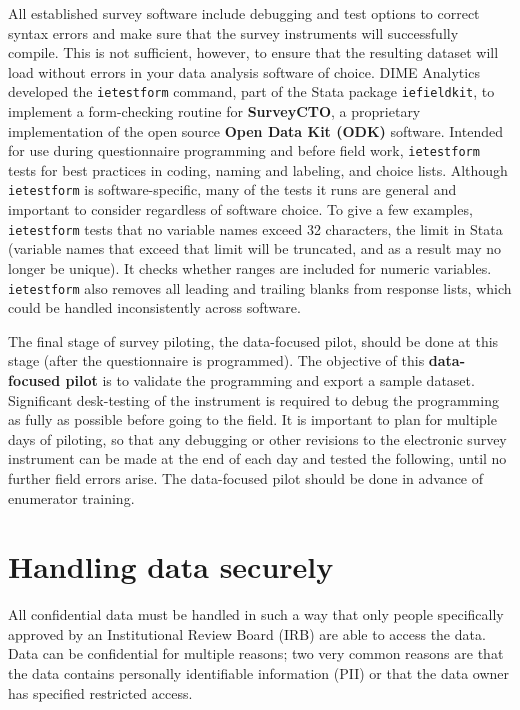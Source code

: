 All established survey software include debugging and test options
to correct syntax errors and make sure that
the survey instruments will successfully compile.
This is not sufficient, however, to ensure that the resulting dataset
will load without errors in your data analysis software of choice.
DIME Analytics developed the \texttt{ietestform} command,
part of the Stata package \texttt{iefieldkit},
to implement a form-checking routine for \textbf{SurveyCTO},
a proprietary implementation of the open source \textbf{Open Data Kit (ODK)} software.
Intended for use during questionnaire programming and before field work,
\texttt{ietestform} tests for best practices
in coding, naming and labeling, and choice lists.
Although \texttt{ietestform} is software-specific,
many of the tests it runs are general and important to consider regardless of software choice.
To give a few examples, \texttt{ietestform} tests that no variable names exceed
32 characters, the limit in Stata (variable names that exceed that limit will
be truncated, and as a result may no longer be unique).
It checks whether ranges are included for numeric variables.
\texttt{ietestform} also removes all leading and trailing blanks from response lists,
which could be handled inconsistently across software.

The final stage of survey piloting, the data-focused pilot, should be done at this stage (after the questionnaire is programmed).
The objective of this \textbf{data-focused pilot}
is to validate the programming and export a sample dataset.
Significant desk-testing of the instrument is required to debug the programming
as fully as possible before going to the field.
It is important to plan for multiple days of piloting,
so that any debugging or other revisions to the electronic survey instrument
can be made at the end of each day and tested the following, until no further field errors arise.
The data-focused pilot should be done in advance of enumerator training.


\section{Handling data securely}

All confidential data must be handled in such a way that only people specifically
approved by an Institutional Review Board (IRB)
are able to access the data.
Data can be confidential for multiple reasons; two
very common reasons are that the data contains personally identifiable information (PII)
or that the data owner has specified restricted access.


